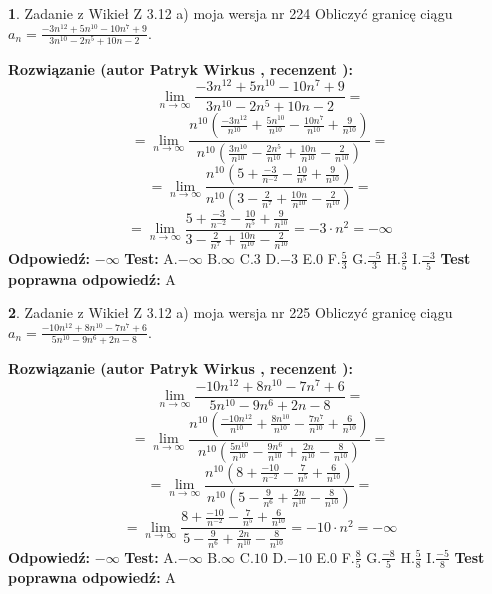 \documentclass[12pt, a4paper]{article}
\theoremstyle{definition} %
\newtheorem{zad}{}
\newcommand{\zadStart}[1]{\begin{zad}#1\newline}
\newcommand{\zadStop}{\end{zad}}
\newcommand{\rozwStart}[2]{\noindent \textbf{Rozwiązanie (autor #1 , recenzent #2): }\newline}
\newcommand{\rozwStop}{\newline}
\newcommand{\odpStart}{\noindent \textbf{Odpowiedź:}\newline}
\newcommand{\odpStop}{\newline}
\newcommand{\testStart}{\noindent \textbf{Test:}\newline}
\newcommand{\testStop}{\newline}
\newcommand{\kluczStart}{\noindent \textbf{Test poprawna odpowiedź:}\newline}
\newcommand{\kluczStop}{\newline}
\begin{document}
\zadStart{Zadanie z Wikieł Z 3.12 a) moja wersja nr 224}
Obliczyć granicę ciągu $a_{n}=\frac{-3n^{12}+5n^{10}-10n^{7}+9}{3n^{10}-2n^{5}+10n-2}$.
\zadStop
\rozwStart{Patryk Wirkus}{}
$$\lim\limits_{n\to\infty}\frac{-3n^{12}+5n^{10}-10n^{7}+9}{3n^{10}-2n^{5}+10n-2}=$$
$$=\lim\limits_{n\to\infty}\frac{n^{10}\left(\frac{-3n^{12}}{n^{10}}+\frac{5n^{10}}{n^{10}}-\frac{10n^{7}}{n^{10}}+\frac{9}{n^{10}}\right)}{n^{10}\left(\frac{3n^{10}}{n^{10}}-\frac{2n^{5}}{n^{10}}+\frac{10n}{n^{10}}-\frac{2}{n^{10}}\right)}=$$
$$=\lim\limits_{n\to\infty}\frac{n^{10}\left(5+\frac{-3}{n^{-2}}-\frac{10}{n^{5}}+\frac{9}{n^{10}}\right)}
{n^{10}\left(3-\frac{2}{n^{7}}+\frac{10n}{n^{10}}-\frac{2}{n^{10}}\right)}=$$
$$=\lim\limits_{n\to\infty}\frac{5+\frac{-3}{n^{-2}}-\frac{10}{n^{5}}+\frac{9}{n^{10}}}{3-\frac{2}{n^{7}}+\frac{10n}{n^{10}}-\frac{2}{n^{10}}}=-3\cdot n^{2} = -\infty$$
\rozwStop
\odpStart
$-\infty$
\odpStop
\testStart
A.$-\infty$
B.$\infty$
C.$3$
D.$-3$
E.$0$
F.$\frac{5}{3}$
G.$\frac{-5}{3}$
H.$\frac{3}{5}$
I.$\frac{-3}{5}$
\testStop
\kluczStart
A
\kluczStop



\zadStart{Zadanie z Wikieł Z 3.12 a) moja wersja nr 225}
Obliczyć granicę ciągu $a_{n}=\frac{-10n^{12}+8n^{10}-7n^{7}+6}{5n^{10}-9n^{6}+2n-8}$.
\zadStop
\rozwStart{Patryk Wirkus}{}
$$\lim\limits_{n\to\infty}\frac{-10n^{12}+8n^{10}-7n^{7}+6}{5n^{10}-9n^{6}+2n-8}=$$
$$=\lim\limits_{n\to\infty}\frac{n^{10}\left(\frac{-10n^{12}}{n^{10}}+\frac{8n^{10}}{n^{10}}-\frac{7n^{7}}{n^{10}}+\frac{6}{n^{10}}\right)}{n^{10}\left(\frac{5n^{10}}{n^{10}}-\frac{9n^{6}}{n^{10}}+\frac{2n}{n^{10}}-\frac{8}{n^{10}}\right)}=$$
$$=\lim\limits_{n\to\infty}\frac{n^{10}\left(8+\frac{-10}{n^{-2}}-\frac{7}{n^{5}}+\frac{6}{n^{10}}\right)}
{n^{10}\left(5-\frac{9}{n^{6}}+\frac{2n}{n^{10}}-\frac{8}{n^{10}}\right)}=$$
$$=\lim\limits_{n\to\infty}\frac{8+\frac{-10}{n^{-2}}-\frac{7}{n^{5}}+\frac{6}{n^{10}}}{5-\frac{9}{n^{6}}+\frac{2n}{n^{10}}-\frac{8}{n^{10}}}=-10\cdot n^{2} = -\infty$$
\rozwStop
\odpStart
$-\infty$
\odpStop
\testStart
A.$-\infty$
B.$\infty$
C.$10$
D.$-10$
E.$0$
F.$\frac{8}{5}$
G.$\frac{-8}{5}$
H.$\frac{5}{8}$
I.$\frac{-5}{8}$
\testStop
\kluczStart
A
\kluczStop
\end{document}
